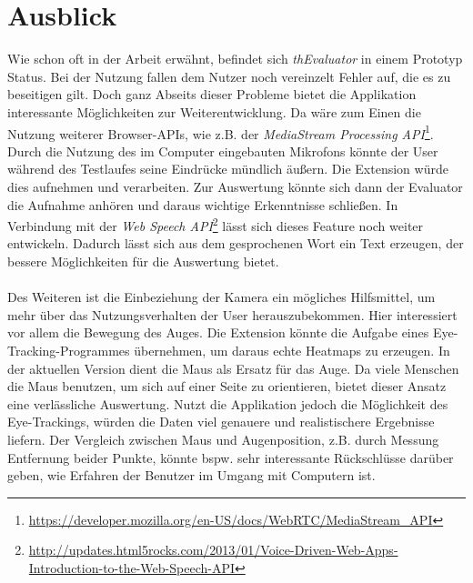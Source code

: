 %
%
%
%

\section{Ausblick}

Wie schon oft in der Arbeit erwähnt, befindet sich \textit{thEvaluator} in einem Prototyp Status. Bei der Nutzung fallen dem Nutzer noch vereinzelt Fehler auf, die es zu beseitigen gilt. Doch ganz Abseits dieser Probleme bietet die Applikation interessante Möglichkeiten zur Weiterentwicklung. Da wäre zum Einen die Nutzung weiterer Browser-APIs, wie z.B. der \textit{MediaStream Processing API}\footnote{\url{https://developer.mozilla.org/en-US/docs/WebRTC/MediaStream_API}}. Durch die Nutzung des im Computer eingebauten Mikrofons könnte der User während des Testlaufes seine Eindrücke mündlich äußern. Die Extension würde dies aufnehmen und verarbeiten. Zur Auswertung könnte sich dann der Evaluator die Aufnahme anhören und daraus wichtige Erkenntnisse schließen. In Verbindung mit der \textit{Web Speech API}\footnote{\url{http://updates.html5rocks.com/2013/01/Voice-Driven-Web-Apps-Introduction-to-the-Web-Speech-API}} lässt sich dieses Feature noch weiter entwickeln. Dadurch lässt sich aus dem gesprochenen Wort ein Text erzeugen, der bessere Möglichkeiten für die Auswertung bietet.\\
\\
Des Weiteren ist die Einbeziehung der Kamera ein mögliches Hilfsmittel, um mehr über das Nutzungsverhalten der User herauszubekommen. Hier interessiert vor allem die Bewegung des Auges. Die Extension könnte die Aufgabe eines Eye-Tracking-Programmes übernehmen, um daraus echte Heatmaps zu erzeugen. In der aktuellen Version dient die Maus als Ersatz für das Auge. Da viele Menschen die Maus benutzen, um sich auf einer Seite zu orientieren, bietet dieser Ansatz eine verlässliche Auswertung. Nutzt die Applikation jedoch die Möglichkeit des Eye-Trackings, würden die Daten viel genauere und realistischere Ergebnisse liefern. Der Vergleich zwischen Maus und Augenposition, z.B. durch Messung Entfernung beider Punkte, könnte bspw. sehr interessante Rückschlüsse darüber geben, wie Erfahren der Benutzer im Umgang mit Computern ist.\\
